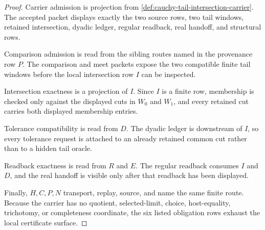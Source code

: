 \begin{proof}
Carrier admission is projection from \autoref{def:cauchy-tail-intersection-carrier}. The accepted packet displays exactly the two source rows, two tail windows, retained intersection, dyadic ledger, regular readback, real handoff, and structural rows.

Comparison admission is read from the sibling routes named in the provenance row $P$. The comparison and meet packets expose the two compatible finite tail windows before the local intersection row $I$ can be inspected.

Intersection exactness is a projection of $I$. Since $I$ is a finite row, membership is checked only against the displayed cuts in $W_0$ and $W_1$, and every retained cut carries both displayed membership entries.

Tolerance compatibility is read from $D$. The dyadic ledger is downstream of $I$, so every tolerance request is attached to an already retained common cut rather than to a hidden tail oracle.

Readback exactness is read from $R$ and $E$. The regular readback consumes $I$ and $D$, and the real handoff is visible only after that readback has been displayed.

Finally, $H,C,P,N$ transport, replay, source, and name the same finite route. Because the carrier has no quotient, selected-limit, choice, host-equality, trichotomy, or completeness coordinate, the six listed obligation rows exhaust the local certificate surface.
\end{proof}

